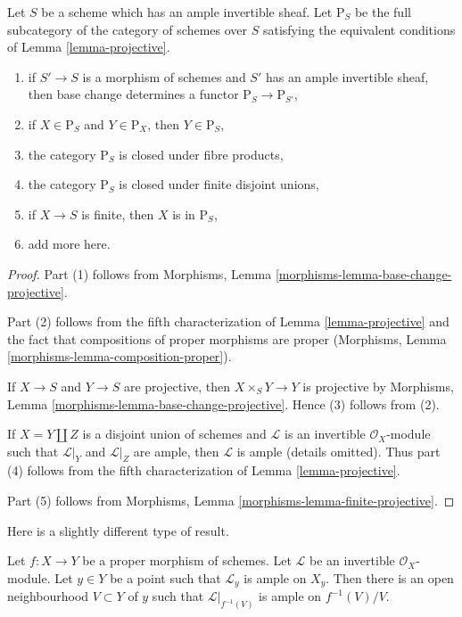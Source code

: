 \begin{lemma}
\label{lemma-category-projective}
Let $S$ be a scheme which has an ample invertible sheaf.
Let $\text{P}_S$ be the full subcategory of the
category of schemes over $S$ satisfying the equivalent
conditions of Lemma \ref{lemma-projective}.
\begin{enumerate}
\item if $S' \to S$ is a morphism of schemes and $S'$ has
an ample invertible sheaf, then base change determines
a functor $\text{P}_S \to \text{P}_{S'}$,
\item if $X \in \text{P}_S$ and $Y \in \text{P}_X$, then $Y \in \text{P}_S$,
\item the category $\text{P}_S$ is closed under fibre products,
\item the category $\text{P}_S$ is closed under
finite disjoint unions,
\item if $X \to S$ is finite, then $X$ is in $\text{P}_S$,
\item add more here.
\end{enumerate}
\end{lemma}

\begin{proof}
Part (1) follows from Morphisms, Lemma
\ref{morphisms-lemma-base-change-projective}.

\medskip\noindent
Part (2) follows from the fifth characterization of
Lemma \ref{lemma-projective} and the fact that compositions
of proper morphisms are proper
(Morphisms, Lemma \ref{morphisms-lemma-composition-proper}).

\medskip\noindent
If $X \to S$ and $Y \to S$ are projective, then
$X \times_S Y \to Y$ is projective by
Morphisms, Lemma \ref{morphisms-lemma-base-change-projective}.
Hence (3) follows from (2).

\medskip\noindent
If $X = Y \amalg Z$ is a disjoint union of schemes
and $\mathcal{L}$ is an invertible $\mathcal{O}_X$-module
such that $\mathcal{L}|_Y$ and $\mathcal{L}|_Z$ are ample, then
$\mathcal{L}$ is ample (details omitted). Thus
part (4) follows from the fifth characterization of
Lemma \ref{lemma-projective}.

\medskip\noindent
Part (5) follows from
Morphisms, Lemma \ref{morphisms-lemma-finite-projective}.
\end{proof}

\noindent
Here is a slightly different type of result.

\begin{lemma}
\label{lemma-ample-in-neighbourhood}
Let $f : X \to Y$ be a proper morphism of schemes.
Let $\mathcal{L}$ be an invertible $\mathcal{O}_X$-module.
Let $y \in Y$ be a point such that $\mathcal{L}_y$ is ample
on $X_y$. Then there is an open neighbourhood $V \subset Y$
of $y$ such that $\mathcal{L}|_{f^{-1}(V)}$ is ample on $f^{-1}(V)/V$.
\end{lemma}

